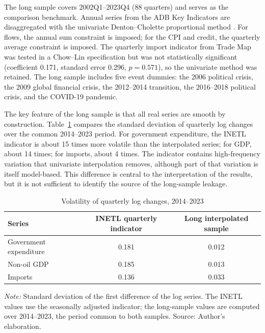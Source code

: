 \documentclass[11pt,a4paper]{article}
\begin{document}
The long sample covers 2002Q1--2023Q4 (88 quarters) and serves as the comparison benchmark. Annual series from the ADB Key Indicators \parencite{adb2025} are disaggregated with the univariate Denton--Cholette proportional method \parencite{denton1971,cholette1984,saxsteiner2013,tempdisagg}. For flows, the annual sum constraint is imposed; for the CPI and credit, the quarterly average constraint is imposed. The quarterly import indicator from Trade Map \parencite{trademap2025} was tested in a Chow--Lin specification but was not statistically significant (coefficient 0.171, standard error 0.296, $p=0.571$), so the univariate method was retained. The long sample includes five event dummies: the 2006 political crisis, the 2009 global financial crisis, the 2012--2014 transition, the 2016--2018 political crisis, and the COVID-19 pandemic.

The key feature of the long sample is that all real series are smooth by construction. Table~\ref{tab:volatility} compares the standard deviation of quarterly log changes over the common 2014--2023 period. For government expenditure, the INETL indicator is about 15 times more volatile than the interpolated series; for GDP, about 14 times; for imports, about 4 times. The indicator contains high-frequency variation that univariate interpolation removes, although part of that variation is itself model-based. This difference is central to the interpretation of the results, but it is not sufficient to identify the source of the long-sample leakage.

\begin{table}[htbp]
\centering
\small
\caption{Volatility of quarterly log changes, 2014--2023}
\label{tab:volatility}
\begin{tabular}{@{}lcc@{}}
\toprule
Series & INETL quarterly indicator & Long interpolated sample \\
\midrule
Government expenditure & 0.181 & 0.012 \\
Non-oil GDP & 0.185 & 0.013 \\
Imports & 0.136 & 0.033 \\
\bottomrule
\end{tabular}
\par\vspace{0.3em}
\begin{minipage}{0.95\textwidth}
\footnotesize\textit{Note:} Standard deviation of the first difference of the log series. The INETL values use the seasonally adjusted indicator; the long-sample values are computed over 2014--2023, the period common to both samples. Source: Author's elaboration.
\end{minipage}
\end{table}
\end{document}
